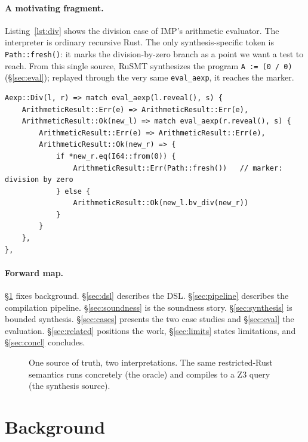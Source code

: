 \documentclass[11pt,a4paper]{article}
\theoremstyle{definition}
\theoremstyle{remark}
\newcommand{\rusmt}{RuSMT}
\newcommand{\imp}{IMP}
\newcommand{\code}[1]{\texttt{#1}}
\begin{document}
\paragraph{A motivating fragment.}
Listing~\ref{lst:div} shows the division case of \imp{}'s arithmetic evaluator.
The interpreter is ordinary recursive Rust. The only synthesis-specific token is
\code{Path::fresh()}: it marks the division-by-zero branch as a point we want a
test to reach. From this single source, \rusmt{} synthesizes the program
\code{A := (0 / 0)} (\S\ref{sec:eval}); replayed through the very same
\code{eval\_aexp}, it reaches the marker.

\begin{lstlisting}[style=rust,caption={The division case of \imp{}'s evaluator
(from \code{lang/src/imp/mod.rs}).},
label={lst:div}]
Aexp::Div(l, r) => match eval_aexp(l.reveal(), s) {
    ArithmeticResult::Err(e) => ArithmeticResult::Err(e),
    ArithmeticResult::Ok(new_l) => match eval_aexp(r.reveal(), s) {
        ArithmeticResult::Err(e) => ArithmeticResult::Err(e),
        ArithmeticResult::Ok(new_r) => {
            if *new_r.eq(I64::from(0)) {
                ArithmeticResult::Err(Path::fresh())   // marker: division by zero
            } else {
                ArithmeticResult::Ok(new_l.bv_div(new_r))
            }
        }
    },
},
\end{lstlisting}

\paragraph{Forward map.}
\S\ref{sec:bg} fixes background. \S\ref{sec:dsl} describes the DSL.
\S\ref{sec:pipeline} describes the compilation pipeline.
\S\ref{sec:soundness} is the soundness story. \S\ref{sec:synthesis} is bounded
synthesis. \S\ref{sec:cases} presents the two case studies and
\S\ref{sec:eval} the evaluation. \S\ref{sec:related} positions the work,
\S\ref{sec:limits} states limitations, and \S\ref{sec:concl} concludes.

\begin{figure}[t]
\centering

\caption{One source of truth, two interpretations. The same restricted-Rust
semantics runs concretely (the oracle) and compiles to a Z3 query (the synthesis
source).}
\label{fig:dual}
\end{figure}

\section{Background}
\label{sec:bg}
\end{document}
